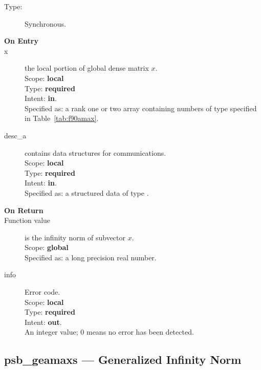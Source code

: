 \begin{description}
\item[Type:] Synchronous.
\item[\bf On Entry]
\item[x] the local portion of global dense matrix
$x$. %
\\
Scope: {\bf local} \\
Type: {\bf required} \\
Intent: {\bf in}.\\
Specified as:  a rank one or two array  
containing numbers of type specified in
Table~\ref{tab:f90amax}.
\item[desc\_a] contains data structures for communications.\\
Scope: {\bf local} \\
Type: {\bf required}\\
Intent: {\bf in}.\\
Specified as: a structured data of type \descdata.

\item[\bf On Return] 
\item[Function value] is the infinity norm of subvector $x$.\\
Scope: {\bf global} \\
Specified as: a long precision real number.
\item[info] Error code.\\
Scope: {\bf local} \\
Type: {\bf required} \\
Intent: {\bf out}.\\
An integer value; 0 means no error has been detected. 
\end{description}
%
%

\clearpage\subsection*{psb\_geamaxs --- Generalized Infinity Norm}

